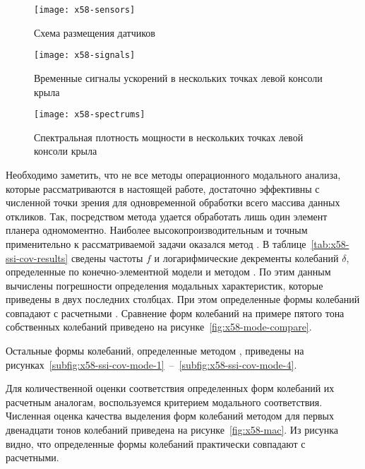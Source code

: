 \begin{figure}[!htb]
	\centerfloat
	\texttt{[image: x58-sensors]}
	\caption{Схема размещения датчиков} \label{fig:x58-sensors}
\end{figure}

\begin{figure}[!htb]
	\centerfloat
	\texttt{[image: x58-signals]}
	\caption{Временные сигналы ускорений в нескольких точках левой консоли крыла} \label{fig:x58-signals}
\end{figure}

\begin{figure}[!htb]
	\centerfloat
	\texttt{[image: x58-spectrums]}
	\caption{Спектральная плотность мощности в нескольких точках левой консоли крыла} \label{fig:x58-spectrums}
\end{figure}

Необходимо заметить, что не все методы операционного модального анализа, которые рассматриваются в настоящей работе, достаточно эффективны с численной точки зрения для одновременной обработки всего массива данных откликов. Так, посредством метода  удается обработать лишь один элемент планера одномоментно. Наиболее высокопроизводительным и точным применительно к рассматриваемой задачи оказался метод . В таблице~\ref{tab:x58-ssi-cov-results} сведены частоты $ f $ и логарифмические декременты колебаний $ \delta $, определенные по конечно-элементной модели и методом . По этим данным вычислены погрешности определения модальных характеристик, которые приведены в двух последних столбцах. При этом определенные формы колебаний  совпадают с расчетными . Сравнение форм колебаний на примере пятого тона собственных колебаний приведено на рисунке~\ref{fig:x58-mode-compare}. 

Остальные формы колебаний, определенные методом , приведены на рисунках~\ref{subfig:x58-ssi-cov-mode-1}~--~\ref{subfig:x58-ssi-cov-mode-4}.

Для количественной оценки соответствия определенных форм колебаний их расчетным аналогам, воспользуемся критерием модального соответствия. Численная оценка качества выделения форм колебаний методом  для первых двенадцати тонов колебаний приведена на рисунке~\ref{fig:x58-mac}. Из рисунка видно, что определенные формы колебаний практически совпадают с расчетными.


